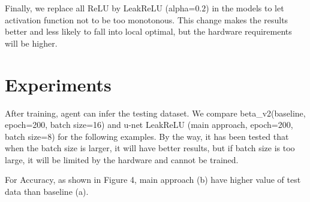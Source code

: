\documentclass[10pt,twocolumn,letterpaper]{article}
\begin{document}
Finally, we replace all ReLU by LeakReLU (alpha=$0.2$) in the models to let activation function not to be too monotonous. This change makes the results better and less likely to fall into local optimal, but the hardware requirements will be higher.

\section{Experiments}

After training, agent can infer the testing dataset. We compare beta\_v2(baseline, epoch=200, batch size=16) and u-net LeakReLU (main approach, epoch=200, batch size=8) for the following examples. By the way, it has been tested that when the batch size is larger, it will have better results, but if batch size is too large, it will be limited by the hardware and cannot be trained. 

For Accuracy, as shown in Figure 4, main approach (b) have higher value of test data than baseline (a).
\end{document}
